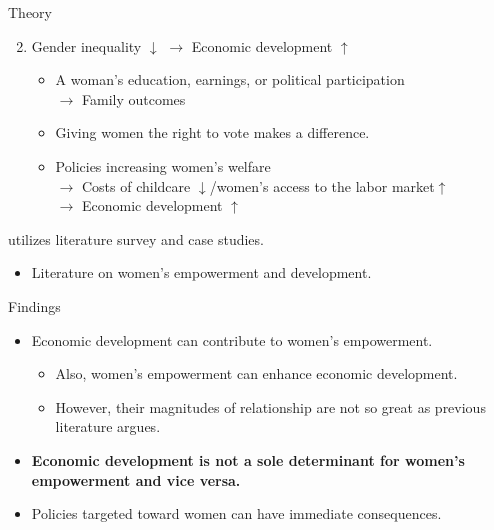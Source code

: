 \documentclass[xcolor=dvipsnames, t]{beamer}
\begin{document}
	\begin{frame}[fragile]{Theory}
		\begin{enumerate}
			\setcounter{enumi}{1}
			\item Gender inequality $\downarrow$ $\rightarrow$ Economic development $\uparrow$ \pause
			\begin{itemize}
				\item A woman's education, earnings, or political participation\\ $\rightarrow$ Family outcomes
				\item Giving women the right to vote makes a difference.
				\item Policies increasing women's welfare\\ $\rightarrow$ Costs of childcare $\downarrow$/women's access to the labor market$\uparrow$\\ $\rightarrow$ Economic development $\uparrow$
			\end{itemize}
		\end{enumerate}
		\bigskip \pause
		\citet{duflo:2012} utilizes literature survey and case studies.
		\begin{itemize}
			\item Literature on women's empowerment and development.
		\end{itemize}
	\end{frame}
	
	\begin{frame}[fragile]{Findings}
		\begin{itemize}
			\item Economic development can contribute to women's empowerment.\pause
			\begin{itemize}
				\item Also, women's empowerment can enhance economic development.\pause
				\item However, their magnitudes of relationship are not so great as previous literature argues.\pause
			\end{itemize}
			\item \textbf{Economic development is not a sole determinant for women's empowerment and vice versa.}\pause
			\item Policies targeted toward women can have immediate consequences.
		\end{itemize}
	\end{frame}
	
\end{document}
